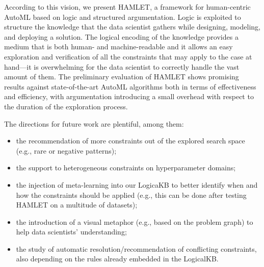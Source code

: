 According to this vision, we present HAMLET, a framework for human-centric AutoML based on logic and structured argumentation.
Logic is exploited to structure the knowledge that the data scientist gathers while designing, modeling, and deploying a solution.
The logical encoding of the knowledge provides a medium that is both human- and machine-readable and it allows an easy exploration and verification of all the constraints that may apply to the case at hand---it is overwhelming for the data scientist to correctly handle the vast amount of them.
The preliminary evaluation of HAMLET shows promising results against state-of-the-art AutoML algorithms both in terms of effectiveness and efficiency, with argumentation introducing a small overhead with respect to the duration of the exploration process.

The directions for future work are plentiful, among them:
\begin{itemize}
    \item the recommendation of more constraints out of the explored search space (e.g., rare or negative patterns);
    \item the support to heterogeneous constraints on hyperparameter domains;
    \item the injection of meta-learning into our LogicaKB to better identify when and how the constraints should be applied (e.g., this can be done after testing HAMLET on a multitude of datasets);
    \item the introduction of a visual metaphor (e.g., based on the problem graph) to help data scientists' understanding;
    \item the study of automatic resolution/recommendation of conflicting constraints, also depending on the rules already embedded in the LogicalKB.
\end{itemize}
